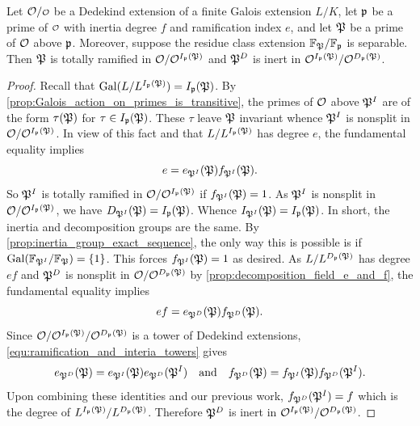     \begin{proposition}\label{prop:inertia_field_e_and_f}
      Let \(\mc{O}/\smc{O}\) be a Dedekind extension of a finite Galois extension \(L/K\), let \(\mathfrak{p}\) be a prime of \(\smc{O}\) with inertia degree \(f\) and ramification index \(e\), and let \(\mathfrak{P}\) be a prime of \(\mathcal{O}\) above \(\mathfrak{p}\). Moreover, suppose the residue class extension \(\mathbb{F}_{\mathfrak{P}}/\mathbb{F}_{\mathfrak{p}}\) is separable. Then \(\mathfrak{P}\) is totally ramified in \(\mathcal{O}/\mathcal{O}^{I_{\mathfrak{p}}(\mathfrak{P})}\) and \(\mathfrak{P}^{D}\) is inert in \(\mathcal{O}^{I_{\mathfrak{p}}(\mathfrak{P})}/\mathcal{O}^{D_{\mathfrak{p}}(\mathfrak{P})}\).
    \end{proposition}
    \begin{proof}
      Recall that \(\operatorname{\mathrm{Gal}}(L/L^{I_{\mathfrak{p}}(\mathfrak{P})}) = I_{\mathfrak{p}}(\mathfrak{P})\). By \cref{prop:Galois_action_on_primes_is_transitive}, the primes of \(\mathcal{O}\) above \(\mathfrak{P}^{I}\) are of the form \(\tau(\mathfrak{P})\) for \(\tau \in I_{\mathfrak{p}}(\mathfrak{P})\). These \(\tau\) leave \(\mathfrak{P}\) invariant whence \(\mathfrak{P}^{I}\) is nonsplit in \(\mathcal{O}/\mathcal{O}^{I_{\mathfrak{p}}(\mathfrak{P})}\). In view of this fact and that \(L/L^{I_{\mathfrak{p}}(\mathfrak{P})}\) has degree \(e\), the fundamental equality implies
      \[
        e = e_{\mathfrak{P}^{I}}(\mathfrak{P})f_{\mathfrak{P}^{I}}(\mathfrak{P}).
      \]
      So \(\mathfrak{P}^{I}\) is totally ramified in \(\mathcal{O}/\mathcal{O}^{I_{\mathfrak{p}}(\mathfrak{P})}\) if \(f_{\mathfrak{P}^{I}}(\mathfrak{P}) = 1\). As \(\mathfrak{P}^{I}\) is nonsplit in \(\mathcal{O}/\mathcal{O}^{I_{\mathfrak{p}}(\mathfrak{P})}\), we have \(D_{\mathfrak{P}^{I}}(\mathfrak{P}) = I_{\mathfrak{p}}(\mathfrak{P})\). Whence \(I_{\mathfrak{P}^{I}}(\mathfrak{P}) = I_{\mathfrak{p}}(\mathfrak{P})\). In short, the inertia and decomposition groups are the same. By \cref{prop:inertia_group_exact_sequence}, the only way this is possible is if \(\operatorname{\mathrm{Gal}}(\mathbb{F}_{\mathfrak{P}^{I}}/\mathbb{F}_{\mathfrak{P}}) = \{1\}\). This forces \(f_{\mathfrak{P}^{I}}(\mathfrak{P}) = 1\) as desired. As \(L/L^{D_{\mathfrak{p}}(\mathfrak{P})}\) has degree \(ef\) and \(\mathfrak{P}^{D}\) is nonsplit in \(\mathcal{O}/\mathcal{O}^{D_{\mathfrak{p}}(\mathfrak{P})}\) by \cref{prop:decomposition_field_e_and_f}, the fundamental equality implies
      \[
        ef = e_{\mathfrak{P}^{D}}(\mathfrak{P})f_{\mathfrak{P}^{D}}(\mathfrak{P}).
      \]
      Since \(\mathcal{O}/\mathcal{O}^{I_{\mathfrak{p}}(\mathfrak{P})}/\mathcal{O}^{D_{\mathfrak{p}}(\mathfrak{P})}\) is a tower of Dedekind extensions, \cref{equ:ramification_and_interia_towers} gives
      \[
        e_{\mathfrak{P}^{D}}(\mathfrak{P}) = e_{\mathfrak{P}^{I}}(\mathfrak{P})e_{\mathfrak{P}^{D}}(\mathfrak{P}^{I}) \quad \text{and} \quad f_{\mathfrak{P}^{D}}(\mathfrak{P}) = f_{\mathfrak{P}^{I}}(\mathfrak{P})f_{\mathfrak{P}^{D}}(\mathfrak{P}^{I}).
      \]
      Upon combining these identities and our previous work, \(f_{\mathfrak{P}^{D}}(\mathfrak{P}^{I}) = f\) which is the degree of \(L^{I_{\mathfrak{p}}(\mathfrak{P})}/L^{D_{\mathfrak{p}}(\mathfrak{P})}\). Therefore \(\mathfrak{P}^{D}\) is inert in \(\mathcal{O}^{I_{\mathfrak{p}}(\mathfrak{P})}/\mathcal{O}^{D_{\mathfrak{p}}(\mathfrak{P})}\).
    \end{proof}


